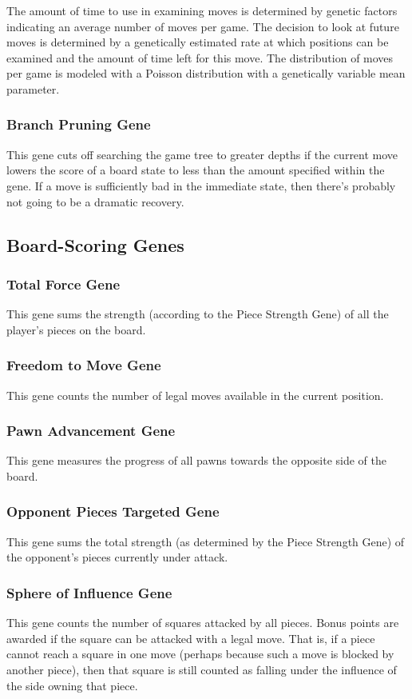 \documentclass[letter]{article}
\renewcommand\_{\textunderscore\allowbreak}
\begin{document}
The amount of time to use in examining moves is determined by genetic factors indicating an average number of moves per game. The decision to look at future moves is determined by a genetically estimated rate at which positions can be examined and the amount of time left for this move. The distribution of moves per game is modeled with a Poisson distribution with a genetically variable mean parameter.

\subsubsection{Branch Pruning Gene}
This gene cuts off searching the game tree to greater depths if the current move lowers the score of a board state to less than the amount specified within the gene. If a move is sufficiently bad in the immediate state, then there's probably not going to be a dramatic recovery.

\subsection{Board-Scoring Genes}
\subsubsection{Total Force Gene}
This gene sums the strength (according to the Piece Strength Gene) of all the player's pieces on the board.

\subsubsection{Freedom to Move Gene}
This gene counts the number of legal moves available in the current position.

\subsubsection{Pawn Advancement Gene}
This gene measures the progress of all pawns towards the opposite side of the board.

\subsubsection{Opponent Pieces Targeted Gene}
This gene sums the total strength (as determined by the Piece Strength Gene) of the opponent's pieces currently under attack.

\subsubsection{Sphere of Influence Gene}
This gene counts the number of squares attacked by all pieces. Bonus points are awarded if the square can be attacked with a legal move. That is, if a piece cannot reach a square in one move (perhaps because such a move is blocked by another piece), then that square is still counted as falling under the influence of the side owning that piece.
\end{document}
